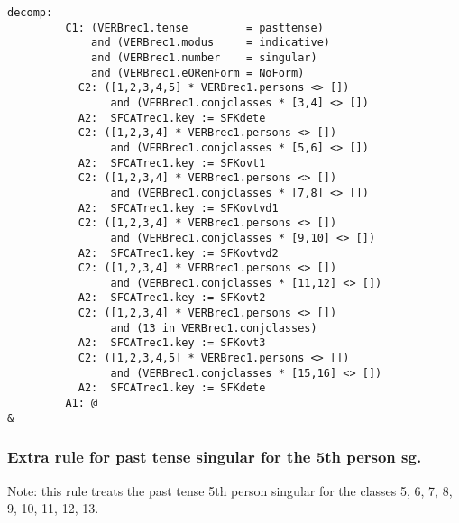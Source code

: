 \begin{verbatim}
decomp:
         C1: (VERBrec1.tense         = pasttense) 
             and (VERBrec1.modus     = indicative) 
             and (VERBrec1.number    = singular)
             and (VERBrec1.eORenForm = NoForm)
           C2: ([1,2,3,4,5] * VERBrec1.persons <> [])
                and (VERBrec1.conjclasses * [3,4] <> [])
           A2:  SFCATrec1.key := SFKdete
           C2: ([1,2,3,4] * VERBrec1.persons <> [])
                and (VERBrec1.conjclasses * [5,6] <> [])
           A2:  SFCATrec1.key := SFKovt1
           C2: ([1,2,3,4] * VERBrec1.persons <> [])
                and (VERBrec1.conjclasses * [7,8] <> [])
           A2:  SFCATrec1.key := SFKovtvd1
           C2: ([1,2,3,4] * VERBrec1.persons <> [])
                and (VERBrec1.conjclasses * [9,10] <> [])
           A2:  SFCATrec1.key := SFKovtvd2
           C2: ([1,2,3,4] * VERBrec1.persons <> [])
                and (VERBrec1.conjclasses * [11,12] <> [])
           A2:  SFCATrec1.key := SFKovt2
           C2: ([1,2,3,4] * VERBrec1.persons <> [])
                and (13 in VERBrec1.conjclasses)
           A2:  SFCATrec1.key := SFKovt3
           C2: ([1,2,3,4,5] * VERBrec1.persons <> [])
                and (VERBrec1.conjclasses * [15,16] <> [])
           A2:  SFCATrec1.key := SFKdete
         A1: @
&
\end{verbatim}
\newpage
\subsubsection{Extra rule for past tense singular for the 5th person sg.}

Note: this rule treats the past tense 5th person singular for the 
classes 5, 6, 7, 8, 9, 10, 11, 12, 13.

